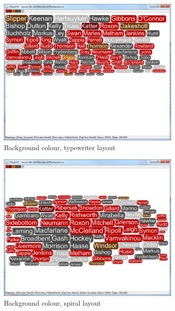 \begin{figure}
\centering

\begin{subfigure}{.5\textwidth}
  \centering
  \includegraphics[scale=0.25]{C1S1L2.png}
  \caption{Background colour, typewriter layout}
\end{subfigure}%
\begin{subfigure}{.5\textwidth}
  \centering
  \includegraphics[scale=0.25]{C1S1L1.png}
  \caption{Background colour, spiral layout}
\end{subfigure}
\begin{subfigure}{.5\textwidth}

\end{subfigure}
\end{figure}
